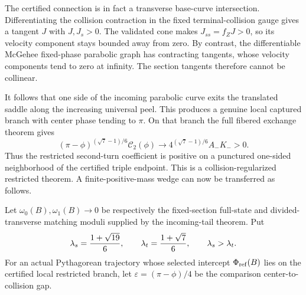 \documentclass[11pt]{article}
\begin{document}
The certified connection is in fact a transverse base-curve intersection.
Differentiating the collision contraction in the fixed terminal-collision
gauge gives a tangent $J$ with $J,J_s>0$. The validated cone makes
$J_{ss}=f_ZJ>0$, so its velocity component stays bounded away from zero.
By contrast, the differentiable McGehee fixed-phase parabolic graph has
contracting tangents, whose velocity components tend to zero at infinity.
The section tangents therefore cannot be collinear.

It follows that one side of the incoming parabolic curve exits the translated
saddle along the increasing universal peel. This produces a genuine local
captured branch with center phase tending to $\pi$. On that branch the full
fibered exchange theorem gives
\[
 (\pi-\phi)^{(\sqrt7-1)/6}\mathcal C_2(\phi)
 \longrightarrow4^{(\sqrt7-1)/6}A_-K_->0.
\]
Thus the restricted second-turn coefficient is positive on a punctured
one-sided neighborhood of the certified triple endpoint. This is a
collision-regularized restricted theorem. A finite-positive-mass wedge can now
be transferred as follows.

Let $\omega_0(B),\omega_1(B)\to0$ be respectively the fixed-section full-state
and divided-transverse matching moduli supplied by the incoming-tail theorem.
Put
\[
 \lambda_s={1+\sqrt{19}\over6},\qquad
 \lambda_t={1+\sqrt7\over6},\qquad \lambda_s>\lambda_t.
\]
For an actual Pythagorean trajectory whose selected intercept
$\Phi_{\rm ref}(B)$ lies on the certified local restricted branch, let
$\varepsilon=(\pi-\phi)/4$ be the comparison center-to-collision gap.
\end{document}
